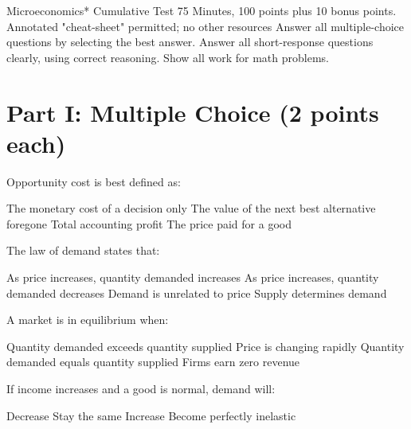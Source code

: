 \documentclass[12pt]{exam}
\begin{document}
\FontEasyRead

\Heading
{Microeconomics*}
{Cumulative Test}
{75 Minutes, 100 points plus 10 bonus points.
    Annotated "cheat-sheet" permitted; no other resources
    Answer all multiple-choice questions by selecting the best answer.
    Answer all short-response questions clearly, using correct reasoning.
    Show all work for math problems.}

\section*{Part I: Multiple Choice (2 points each)}

\begin{questions}

    \begin{mcquestion}[2]
        Opportunity cost is best defined as:
        \begin{choices}
            \choice The monetary cost of a decision only
            \CorrectChoice The value of the next best alternative foregone
            \choice Total accounting profit
            \choice The price paid for a good
        \end{choices}
    \end{mcquestion}

    \begin{mcquestion}[2]
        The law of demand states that:
        \begin{choices}
            \choice As price increases, quantity demanded increases
            \CorrectChoice As price increases, quantity demanded decreases
            \choice Demand is unrelated to price
            \choice Supply determines demand
        \end{choices}
    \end{mcquestion}

    \begin{mcquestion}[2]
        A market is in equilibrium when:
        \begin{choices}
            \choice Quantity demanded exceeds quantity supplied
            \choice Price is changing rapidly
            \CorrectChoice Quantity demanded equals quantity supplied
            \choice Firms earn zero revenue
        \end{choices}
    \end{mcquestion}

    \begin{mcquestion}[2]
        If income increases and a good is normal, demand will:
        \begin{choices}
            \choice Decrease
            \choice Stay the same
            \CorrectChoice Increase
            \choice Become perfectly inelastic
        \end{choices}
    \end{mcquestion}


\end{questions}
\end{document}
